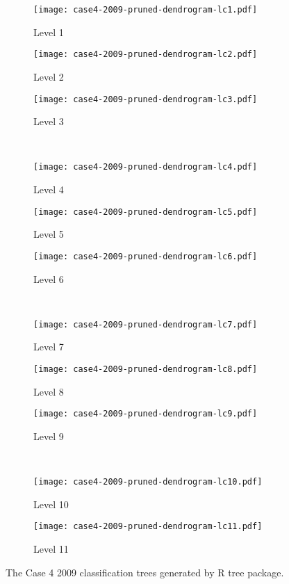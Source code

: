 \begin{appendices}

\begin{figure}[!ht] \centering
	\captionsetup[subfigure]{width=2.0in}
	\begin{subfigure}[t]{0.32\textwidth}
		\texttt{[image: case4-2009-pruned-dendrogram-lc1.pdf]}
		\caption{Level 1}
	\end{subfigure}
	\begin{subfigure}[t]{0.32\textwidth}
		\texttt{[image: case4-2009-pruned-dendrogram-lc2.pdf]}
		\caption{Level 2}
	\end{subfigure}
	\begin{subfigure}[t]{0.32\textwidth}
		\texttt{[image: case4-2009-pruned-dendrogram-lc3.pdf]}
		\caption{Level 3}
	\end{subfigure}\\
	\vspace{5pt}
	\begin{subfigure}[t]{0.32\textwidth}
		\texttt{[image: case4-2009-pruned-dendrogram-lc4.pdf]}
		\caption{Level 4}
	\end{subfigure}
	\begin{subfigure}[t]{0.32\textwidth}
		\texttt{[image: case4-2009-pruned-dendrogram-lc5.pdf]}
		\caption{Level 5}
	\end{subfigure}
	\begin{subfigure}[t]{0.32\textwidth}
		\texttt{[image: case4-2009-pruned-dendrogram-lc6.pdf]}
		\caption{Level 6}
	\end{subfigure}\\
	\vspace{5pt}	
	\begin{subfigure}[t]{0.32\textwidth}
		\texttt{[image: case4-2009-pruned-dendrogram-lc7.pdf]}
		\caption{Level 7}
	\end{subfigure}
	\begin{subfigure}[t]{0.32\textwidth}
		\texttt{[image: case4-2009-pruned-dendrogram-lc8.pdf]}
		\caption{Level 8}
	\end{subfigure}
	\begin{subfigure}[t]{0.32\textwidth}
		\texttt{[image: case4-2009-pruned-dendrogram-lc9.pdf]}
		\caption{Level 9}
	\end{subfigure}\\
	\vspace{5pt}
	\begin{subfigure}[t]{0.32\textwidth}
		\texttt{[image: case4-2009-pruned-dendrogram-lc10.pdf]}
		\caption{Level 10}
	\end{subfigure}
	\begin{subfigure}[t]{0.32\textwidth}
		\texttt{[image: case4-2009-pruned-dendrogram-lc11.pdf]}
		\caption{Level 11}
	\end{subfigure}
	\vspace{5pt}
	\caption[The Case 4 2009 classification trees generated by R tree package.]{The Case 4 2009 classification trees generated by R tree package.}
	\label{fig: appendix-fig.c29.tree}
\end{figure}


\end{appendices}
